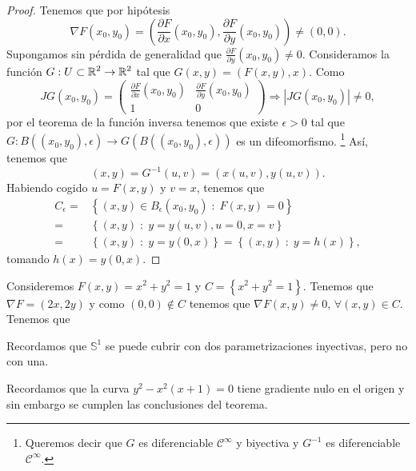 \begin{proof}
Tenemos que por hipótesis
\[\nabla F\left(x_{0}, y_{0}\right)=\left(\frac{\partial F}{\partial x}\left(x_{0}, y_{0}\right), \frac{\partial F}{\partial y}\left(x_{0}, y_{0}\right)\right)\neq \left(0,0\right) .\]
Supongamos sin pérdida de generalidad que $\displaystyle \frac{\partial F}{\partial y}\left(x_{0}, y_{0}\right)\neq 0 $. Consideramos la función $\displaystyle G : U \subset \mathbb{R}^{2}\to \mathbb{R}^{2} $ tal que $\displaystyle G\left(x,y\right)=\left(F\left(x,y\right), x\right) $. Como 
\[JG\left(x_{0}, y_{0}\right)=\begin{pmatrix} \frac{\partial F}{\partial x}\left(x_{0}, y_{0}\right) & \frac{\partial F}{\partial y}\left(x_{0}, y_{0}\right) \\ 1 & 0 \end{pmatrix} \Rightarrow \left|JG\left(x_{0}, y_{0}\right)\right|\neq 0 ,\]
por el teorema de la función inversa tenemos que existe $\displaystyle \epsilon > 0 $ tal que $\displaystyle G : B\left(\left(x_{0}, y_{0}\right), \epsilon \right)\to G\left(B\left(\left(x_{0}, y_{0}\right), \epsilon \right)\right) $ es un difeomorfismo. \footnote{Queremos decir que $\displaystyle G $ es diferenciable $\displaystyle \mathcal{C}^{\infty} $ y biyectiva y $\displaystyle G^{-1} $ es diferenciable $\displaystyle \mathcal{C}^{\infty} $.} Así, tenemos que 
\[\left(x,y\right)=G^{-1}\left(u,v\right)=\left(x\left(u,v\right), y\left(u,v\right)\right) .\]
Habiendo cogido $\displaystyle u = F\left(x,y\right) $ y $\displaystyle v = x $, tenemos que 
\[
\begin{split}
	C_{\epsilon }= & \left\{ \left(x,y\right) \in B_{\epsilon }\left(x_{0}, y_{0}\right)\; : \; F\left(x,y\right)=0\right\}  \\
	= & \left\{ \left(x,y\right) \; : \; y = y\left(u,v\right), u = 0, x = v\right\} \\
	= & \left\{ \left(x,y\right)\; : \; y = y\left(0,x\right)\right\} = \left\{ \left(x,y\right) \; : \; y = h\left(x\right)\right\}  ,
\end{split}
\]
tomando $\displaystyle h\left(x\right)=y\left(0,x\right) $. 
\end{proof}
\begin{eg}
	Consideremos $\displaystyle F\left(x,y\right)=x^{2}+y^{2}=1 $ y $\displaystyle C = \left\{ x^{2}+y^{2}=1\right\}  $. Tenemos que $\displaystyle \nabla F = \left(2x, 2y\right) $ y como $\displaystyle \left(0,0\right)\not\in C $ tenemos que $\displaystyle \nabla F\left(x,y\right)\neq 0 $, $\displaystyle \forall\left(x,y\right)\in C $. Tenemos que 
\end{eg}
\begin{observation}
	Recordamos que $\displaystyle \mathbb{S}^{1} $ se puede cubrir con dos parametrizaciones inyectivas, pero no con una. 
\end{observation}
\begin{observation}
Recordamos que la curva $\displaystyle y^{2}-x^{2}\left(x+1\right)=0 $ tiene gradiente nulo en el origen y sin embargo se cumplen las conclusiones del teorema.
\end{observation}

